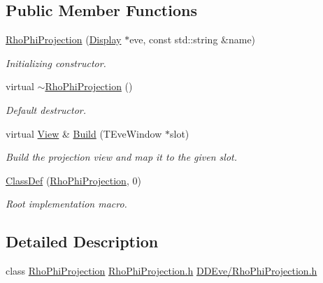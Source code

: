 \subsection*{Public Member Functions}
\begin{DoxyCompactItemize}
\item 
\hyperlink{class_d_d4hep_1_1_rho_phi_projection_abe10facbc4c46e43a3854efada4c99ad}{RhoPhiProjection} (\hyperlink{class_d_d4hep_1_1_display}{Display} $\ast$eve, const std::string \&name)
\begin{DoxyCompactList}\small\item\em Initializing constructor. \item\end{DoxyCompactList}\item 
virtual \hyperlink{class_d_d4hep_1_1_rho_phi_projection_a9dc8283aa69ce065236b29de09905b54}{$\sim$RhoPhiProjection} ()
\begin{DoxyCompactList}\small\item\em Default destructor. \item\end{DoxyCompactList}\item 
virtual \hyperlink{class_d_d4hep_1_1_view}{View} \& \hyperlink{class_d_d4hep_1_1_rho_phi_projection_a6a8d8e5c6a15d559da719c23eb8d7b8c}{Build} (TEveWindow $\ast$slot)
\begin{DoxyCompactList}\small\item\em Build the projection view and map it to the given slot. \item\end{DoxyCompactList}\item 
\hyperlink{class_d_d4hep_1_1_rho_phi_projection_a33fb99400480c317f4e4d9fabf48836c}{ClassDef} (\hyperlink{class_d_d4hep_1_1_rho_phi_projection}{RhoPhiProjection}, 0)
\begin{DoxyCompactList}\small\item\em Root implementation macro. \item\end{DoxyCompactList}\end{DoxyCompactItemize}


\subsection{Detailed Description}
class \hyperlink{class_d_d4hep_1_1_rho_phi_projection}{RhoPhiProjection} \hyperlink{_rho_phi_projection_8h}{RhoPhiProjection.h} \hyperlink{_rho_phi_projection_8h}{DDEve/RhoPhiProjection.h} 

